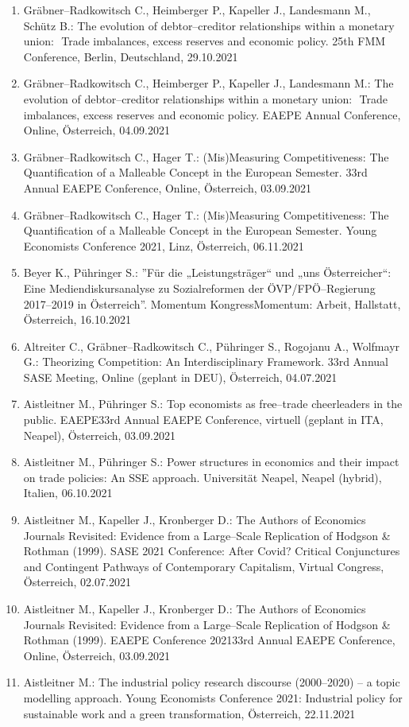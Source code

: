 \begin{enumerate}
	\item Gräbner--Radkowitsch C., Heimberger P., Kapeller J., Landesmann M., Schütz B.: The evolution of debtor--creditor relationships within a monetary union:  Trade imbalances, excess reserves and economic policy. 25th FMM Conference, Berlin, Deutschland, 29.10.2021
	\item Gräbner--Radkowitsch C., Heimberger P., Kapeller J., Landesmann M.: The evolution of debtor--creditor relationships within a monetary union:  Trade imbalances, excess reserves and economic policy. EAEPE Annual Conference, Online, Österreich, 04.09.2021
	\item Gräbner--Radkowitsch C., Hager T.: (Mis)Measuring Competitiveness: The Quantification of a Malleable Concept in the European Semester. 33rd Annual EAEPE Conference, Online, Österreich, 03.09.2021
	\item Gräbner--Radkowitsch C., Hager T.: (Mis)Measuring Competitiveness:  The Quantification of a Malleable Concept in the European Semester. Young Economists Conference 2021, Linz, Österreich, 06.11.2021
	\item Beyer K., Pühringer S.: ''Für die „Leistungsträger“ und „uns Österreicher“: Eine Mediendiskursanalyse zu Sozialreformen der ÖVP/FPÖ--Regierung 2017--2019 in Österreich''. Momentum KongressMomentum: Arbeit, Hallstatt, Österreich, 16.10.2021
	\item Altreiter C., Gräbner--Radkowitsch C., Pühringer S., Rogojanu A., Wolfmayr G.: Theorizing Competition: An Interdisciplinary Framework. 33rd Annual SASE Meeting, Online (geplant in DEU), Österreich, 04.07.2021
	\item Aistleitner M., Pühringer S.: Top economists as free--trade cheerleaders in the public. EAEPE33rd Annual EAEPE Conference, virtuell (geplant in ITA, Neapel), Österreich, 03.09.2021
	\item Aistleitner M., Pühringer S.: Power structures in economics and their impact on trade policies: An SSE approach. Universität Neapel, Neapel (hybrid), Italien, 06.10.2021
	\item Aistleitner M., Kapeller J., Kronberger D.: The Authors of Economics Journals Revisited: Evidence from a Large--Scale Replication of Hodgson \& Rothman (1999). SASE 2021 Conference: After Covid? Critical Conjunctures and Contingent Pathways of Contemporary Capitalism, Virtual Congress, Österreich, 02.07.2021
	\item Aistleitner M., Kapeller J., Kronberger D.: The Authors of Economics Journals Revisited: Evidence from a Large--Scale Replication of Hodgson \& Rothman (1999). EAEPE Conference 202133rd Annual EAEPE Conference, Online, Österreich, 03.09.2021
	\item Aistleitner M.: The industrial policy research discourse (2000--2020) – a topic modelling approach. Young Economists Conference 2021: Industrial policy for sustainable work and a green transformation, Österreich, 22.11.2021
\end{enumerate}
